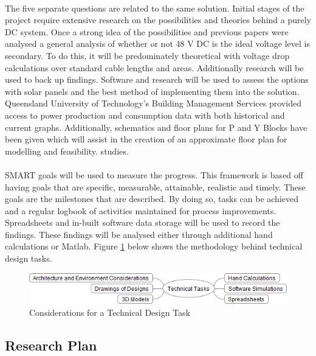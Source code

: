 \paragraph{}
The five separate questions are related to the same solution. Initial stages of the project require extensive research on the possibilities and theories behind a purely DC system. Once a strong idea of the possibilities and previous papers were analysed a general analysis of whether or not 48 V DC is the ideal voltage level is secondary. To do this, it will be predominately theoretical with voltage drop calculations over standard cable lengths and areas. Additionally research will be used to back up findings. Software and research will be used to assess the options with solar panels and the best method of implementing them into the solution. Queensland University of Technology's Building Management Services provided access to power production and consumption data with both historical and current graphs. Additionally, schematics and floor plans for P and Y Blocks have been given which will assist in the creation of an approximate floor plan for modelling and feasibility. studies.   

\paragraph{}
SMART goals will be used to measure the progress. This framework is based off having goals that are specific, measurable, attainable, realistic and timely. These goals are the milestones that are described. By doing so, tasks can be achieved and a regular logbook of activities maintained for process improvements. Spreadsheets and in-built software data storage will be used to record the findings. These findings will be analysed either through additional hand calculations or Matlab. Figure \ref{fig:PracProcedure} below shows the methodology behind technical design tasks.    

\begin{figure}[H]
\hfill\includegraphics[width = 160mm]{images/Practical_Planning_Rev2}\hspace*{\fill}
\caption{Considerations for a Technical Design Task}
\label{fig:PracProcedure}
\end{figure}     

\subsection{Research Plan}

